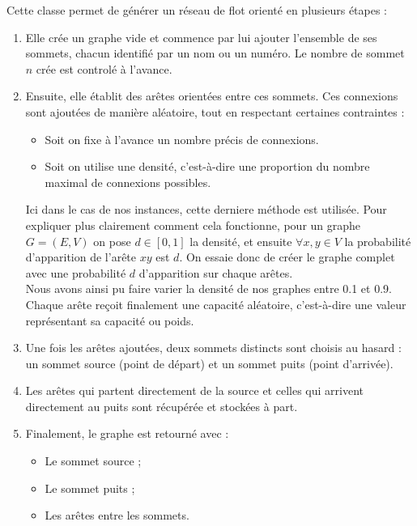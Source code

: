 \documentclass[a4paper]{article}
\begin{document}
Cette classe permet de générer un réseau de flot orienté en plusieurs étapes :

\begin{enumerate}
    \item Elle crée un graphe vide et commence par lui ajouter l'ensemble de ses sommets, chacun identifié par un nom ou un numéro. Le nombre de sommet $n$ crée est controlé à l'avance.
    
    \item Ensuite, elle établit des arêtes orientées entre ces sommets. Ces connexions sont ajoutées de manière aléatoire, tout en respectant certaines contraintes :
    \begin{itemize}
        \item Soit on fixe à l’avance un nombre précis de connexions.
        \item Soit on utilise une densité, c’est-à-dire une proportion du nombre maximal de connexions possibles.
    \end{itemize}
	Ici dans le cas de nos instances, cette derniere méthode est utilisée. Pour expliquer plus clairement comment cela fonctionne, pour un graphe $G=(E,V)$ on pose $d \in [0,1]$ la densité, et ensuite $\forall x, y \in V$ la probabilité d'apparition de l'arête $xy$ est $d$. On essaie donc de créer le graphe complet avec une probabilité $d$ d'apparition sur chaque arêtes.\\
	Nous avons ainsi pu faire varier la densité de nos graphes entre 0.1 et 0.9.\\
    Chaque arête reçoit finalement une capacité aléatoire, c’est-à-dire une valeur représentant sa \og capacité\fg{} ou \og poids\fg{}.
    
    \item Une fois les arêtes ajoutées, deux sommets distincts sont choisis au hasard : un sommet source (point de départ) et un sommet puits (point d’arrivée).
    
    \item Les arêtes qui partent directement de la source et celles qui arrivent directement au puits sont récupérée et stockées à part.
    
    \item Finalement, le graphe est retourné avec :
    \begin{itemize}
        \item Le sommet source ;
        \item Le sommet puits ;
        \item Les arêtes entre les sommets.
    \end{itemize}
\end{enumerate}
\end{document}
